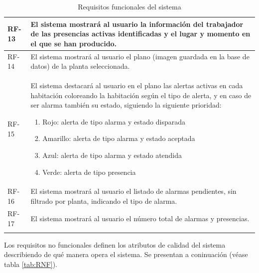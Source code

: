 \begin{longtable}{|p{1cm}|p{14cm}|}
	\hline
	RF-13	&	El sistema mostrará al usuario la información del trabajador de las presencias activas identificadas y el lugar y momento en el que se han producido. \\
	\hline
	RF-14	&	El sistema mostrará al usuario el plano (imagen guardada en la base de datos) de la planta seleccionada.  \\
	\hline
	RF-15	&	El sistema destacará al usuario en el plano las alertas activas en cada habitación coloreando la habitación según el tipo de alerta, y en caso de ser alarma también su estado, siguiendo la siguiente prioridad:
	\begin{enumerate}
		\item Rojo: alerta de tipo alarma y estado disparada
		\item Amarillo: alerta de tipo alarma y estado aceptada
		\item Azul: alerta de tipo alarma y estado atendida
		\item Verde: alerta de tipo presencia
	\end{enumerate}\\
	\hline
	RF-16	&	El sistema mostrará al usuario el listado de alarmas pendientes, sin filtrado por planta, indicando el tipo de alarma. \\
	\hline
	RF-17	&	El sistema mostrará al usuario el número total de alarmas y presencias. \\
	\hline
\caption{Requisitos funcionales del sistema}
\label{tab:RF}
\end{longtable}

Los requisitos no funcionales definen los atributos de calidad del sistema describiendo de qué manera opera el sistema. Se presentan a coninuación (véase tabla \ref{tab:RNF}).

